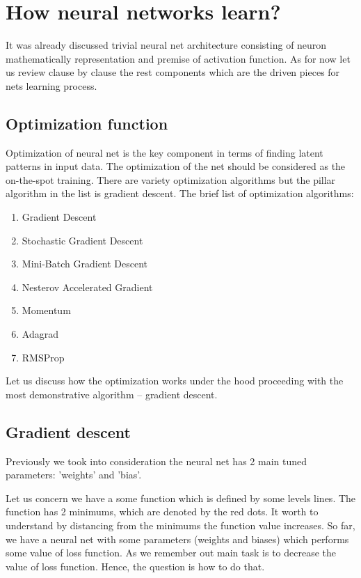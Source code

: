 \section{How neural networks learn?}
It was already discussed trivial neural net architecture consisting of neuron mathematically representation and premise of activation function. As for now let us review clause by clause the rest components which are the driven pieces for nets learning process.

\subsection{Optimization function}
Optimization of neural net is the key component in terms of finding latent patterns in input data. The optimization of the net should be considered as the on-the-spot training. There are variety optimization algorithms but the pillar algorithm in the list is gradient descent.
The brief list of optimization algorithms:
\begin{enumerate}
    \item Gradient Descent
    \item Stochastic Gradient Descent
    \item Mini-Batch Gradient Descent
    \item Nesterov Accelerated Gradient
    \item Momentum
    \item Adagrad
    \item RMSProp
\end{enumerate}
Let us discuss how the optimization works under the hood proceeding with the most demonstrative algorithm -- gradient descent.

\subsection{Gradient descent}
Previously we took into consideration the neural net has 2 main tuned parameters: 'weights' and 'bias'.

Let us concern we have a some function which is defined by some levels lines. The function has 2 minimums, which are denoted by the red dots.  It worth to understand by distancing from the minimums the function value increases. 
So far, we have a neural net with some parameters (weights and biases) which performs some value of loss function. As we remember out main task is to decrease the value of loss function. Hence, the question is how to do that.

